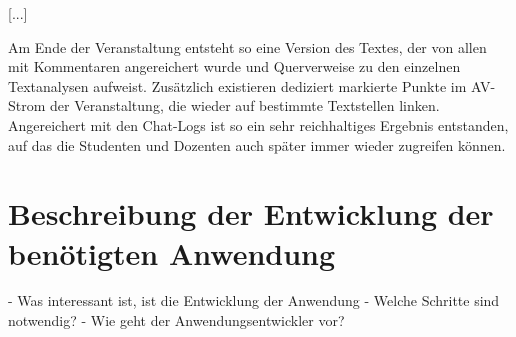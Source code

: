 [...]

  Am Ende der Veranstaltung entsteht so eine Version des Textes, der von allen mit Kommentaren angereichert wurde und Querverweise zu den einzelnen Textanalysen aufweist. Zusätzlich existieren dediziert markierte Punkte im AV-Strom der Veranstaltung, die wieder auf bestimmte Textstellen linken. Angereichert mit den Chat-Logs ist so ein sehr reichhaltiges Ergebnis entstanden, auf das die Studenten und Dozenten auch später immer wieder zugreifen können.




\section{Beschreibung der Entwicklung der benötigten Anwendung} %
\label{sec:beschreibung_der_entwicklung_der_benoetigten_anwendung}

  - Was interessant ist, ist die Entwicklung der Anwendung
  - Welche Schritte sind notwendig?
  - Wie geht der Anwendungsentwickler vor?



